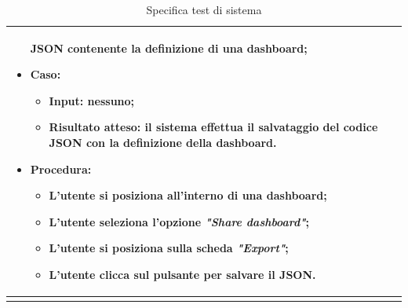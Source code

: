 \begin{longtable}{|C{2.5cm}|C{13cm}|}
\begin{itemize}
	JSON contenente la definizione di una dashboard;
	\item \textbf{Caso}: 
	\begin{itemize}
		\item \textbf{Input}: nessuno;
		\item \textbf{Risultato atteso}: il sistema effettua il salvataggio del codice JSON con la definizione della dashboard.
	\end{itemize}
	\item \textbf{Procedura}:
	\begin{itemize}
		\item L'utente si posiziona all'interno di una dashboard;
		\item L'utente seleziona l'opzione \emph{"Share dashboard"};
		\item L'utente si posiziona sulla scheda \emph{"Export"};
		\item L'utente clicca sul pulsante per salvare il JSON.
	\end{itemize} 
\end{itemize}
	 \\
	\hline
	\caption{Specifica test di sistema}
	\label{tabella:specifica TS}
\end{longtable}
\renewcommand{\arraystretch}{1}
\newpage

